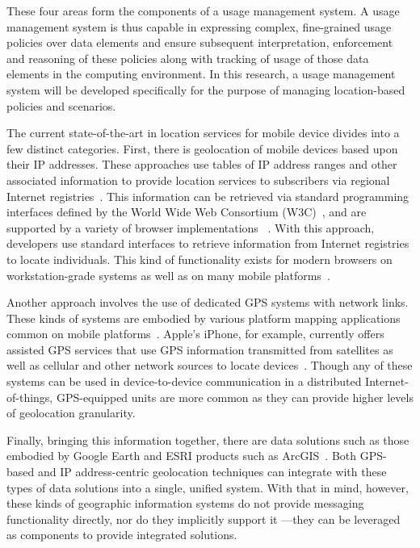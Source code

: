 \documentclass{sbir}
\begin{document}
These four areas form the components of a usage management system. A usage management system is thus capable in expressing complex, fine-grained usage policies over data elements and ensure subsequent interpretation, enforcement and reasoning of these policies along with tracking of usage of those data elements in the computing environment. In this research, a usage management system will be developed specifically for the purpose of managing location-based policies and scenarios. 

The current state-of-the-art in location services for mobile device divides into a few distinct categories. First, there is geolocation of mobile devices based upon their IP addresses. These approaches use tables of IP address ranges and other associated information to provide location services to subscribers via regional Internet registries~\cite{AIRN:13,RIPE:13}. This information can be retrieved via standard programming interfaces defined by the World Wide Web Consortium (W3C)~\cite{w3c:13}, and are supported by a variety of browser implementations ~\cite{firefox:13,Pi:13}. With this approach, developers use standard interfaces to retrieve information from Internet registries to locate individuals. This kind of functionality exists for modern browsers on workstation-grade systems as well as on many mobile platforms~\cite{safari:13,opera:13}.

Another approach involves the use of dedicated GPS systems with network links. These kinds of systems are embodied by various platform mapping applications common on mobile platforms~\cite{gmap:13,amap:13}. Apple's iPhone, for example, currently offers assisted GPS services that use GPS information transmitted from satellites as well as cellular and other network sources to locate devices~\cite{amap:13}. Though any of these systems can be used in device-to-device communication in a distributed Internet-of-things, GPS-equipped units are more common as they can provide higher levels of geolocation granularity.

Finally, bringing this information together, there are data solutions such as those embodied by Google Earth and ESRI products such as ArcGIS~\cite{esri:13,gearth:13}. Both GPS-based and IP address-centric geolocation techniques can integrate with these types of data solutions into a single, unified system. With that in mind, however, these kinds of geographic information systems do not provide messaging functionality directly, nor do they implicitly support it ---they can be leveraged as components to provide integrated solutions.
\end{document}
